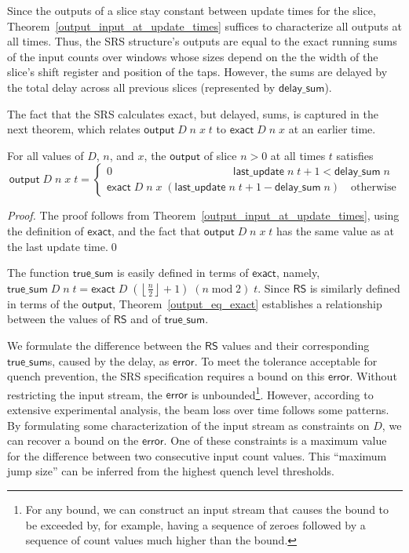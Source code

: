 \documentclass{llncs}
\begin{document}
Since the outputs of a slice stay constant between update times for the slice, Theorem~\ref{output_input_at_update_times} suffices to characterize all outputs at all times.
Thus, the SRS structure's outputs are equal to the exact running sums of the input counts over windows whose sizes depend on the the width of the slice's shift register and position of the taps.
However, the sums are delayed by the total delay across all previous slices (represented by $\mathsf{delay\_sum}$).

The fact that the SRS calculates exact, but delayed, sums, is captured in the next theorem, which relates $\mathsf{output}\;D\;n\;x\;t$ to $\mathsf{exact}\;D\;n\;x$ at an earlier time.

\begin{theorem}\label{output_eq_exact}
For all values of $D$, $n$, and $x$, the $\mathsf{output}$ of slice $n>0$ at all times $t$ satisfies
\begin{equation*}
\mathsf{output}\;D\;n\;x\;t=\begin{cases}0\qquad\qquad\qquad\qquad\qquad\quad\mathsf{last\_update}\;n\;t+1<\mathsf{delay\_sum}\;n\\\mathsf{exact}\;D\;n\;x\;(\mathsf{last\_update}\;n\;t+1-\mathsf{delay\_sum}\;n)\quad\text{otherwise}\end{cases}
\end{equation*}
\end{theorem}
\begin{proof}
The proof follows from Theorem~\ref{output_input_at_update_times}, using the definition of $\mathsf{exact}$, and the fact that $\mathsf{output}\;D\;n\;x\;t$ has the same value as at the last update time.\qed
\end{proof}

The function $\mathsf{true\_sum}$ is easily defined in terms of $\mathsf{exact}$, namely, $\mathsf{true\_sum}\;D\;n\;t = \mathsf{exact}\;D\;\left(\left\lfloor\frac{n}{2}\right\rfloor+1\right)\;(n\operatorname{mod}2)\;t$.
Since $\mathsf{RS}$ is similarly defined in terms of the $\mathsf{output}$, Theorem~\ref{output_eq_exact} establishes a relationship between the values of $\mathsf{RS}$ and of $\mathsf{true\_sum}$.

We formulate the difference between the $\mathsf{RS}$ values and their corresponding $\mathsf{true\_sum}$s, caused by the delay, as $\mathsf{error}$.
To meet the tolerance acceptable for quench prevention, the SRS specification requires a bound on this $\mathsf{error}$.
Without restricting the input stream, the $\mathsf{error}$ is unbounded\footnote{For any bound, we can construct an input stream that causes the bound to be exceeded by, for example, having a sequence of zeroes followed by a sequence of count values much higher than the bound.}.
However, according to extensive experimental analysis, the beam loss over time follows some patterns.
By formulating some characterization of the input stream as constraints on $D$, we can recover a bound on the $\mathsf{error}$.
One of these constraints is a maximum value for the difference between two consecutive input count values.
This ``maximum jump size'' can be inferred from the highest quench level thresholds.
\end{document}
